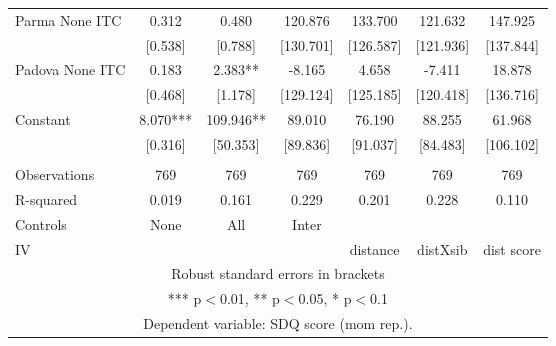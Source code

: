\begin{tabular}{lcccccc}
Parma None ITC & 0.312 & 0.480 & 120.876 & 133.700 & 121.632 & 147.925 \\
 & [0.538] & [0.788] & [130.701] & [126.587] & [121.936] & [137.844] \\
Padova None ITC & 0.183 & 2.383** & -8.165 & 4.658 & -7.411 & 18.878 \\
 & [0.468] & [1.178] & [129.124] & [125.185] & [120.418] & [136.716] \\
Constant & 8.070*** & 109.946** & 89.010 & 76.190 & 88.255 & 61.968 \\
 & [0.316] & [50.353] & [89.836] & [91.037] & [84.483] & [106.102] \\
 &  &  &  &  &  &  \\
Observations & 769 & 769 & 769 & 769 & 769 & 769 \\
R-squared & 0.019 & 0.161 & 0.229 & 0.201 & 0.228 & 0.110 \\
Controls & None & All & Inter &  &  &  \\
 IV &  &  &  & distance & distXsib & dist score \\ \hline
\multicolumn{7}{c}{ Robust standard errors in brackets} \\
\multicolumn{7}{c}{ *** p$<$0.01, ** p$<$0.05, * p$<$0.1} \\
\multicolumn{7}{c}{ Dependent variable: SDQ score (mom rep.).} \\
\end{tabular}
